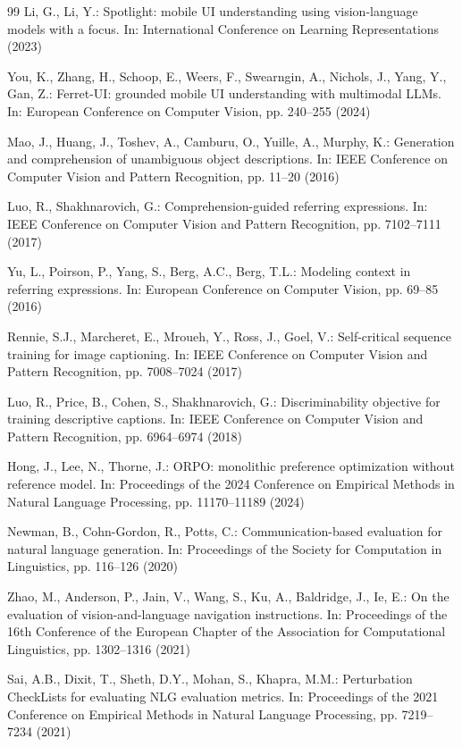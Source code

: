 \documentclass[runningheads,a4paper]{llncs}
\begin{document}
\begin{thebibliography}{99}
Li, G., Li, Y.: Spotlight: mobile UI understanding using vision-language models with a focus.
In: International Conference on Learning Representations (2023)

You, K., Zhang, H., Schoop, E., Weers, F., Swearngin, A., Nichols, J., Yang, Y., Gan, Z.:
Ferret-UI: grounded mobile UI understanding with multimodal LLMs. In: European Conference on
Computer Vision, pp. 240--255 (2024)

Mao, J., Huang, J., Toshev, A., Camburu, O., Yuille, A., Murphy, K.: Generation and comprehension
of unambiguous object descriptions. In: IEEE Conference on Computer Vision and Pattern
Recognition, pp. 11--20 (2016)

Luo, R., Shakhnarovich, G.: Comprehension-guided referring expressions. In: IEEE Conference on
Computer Vision and Pattern Recognition, pp. 7102--7111 (2017)

Yu, L., Poirson, P., Yang, S., Berg, A.C., Berg, T.L.: Modeling context in referring expressions.
In: European Conference on Computer Vision, pp. 69--85 (2016)

Rennie, S.J., Marcheret, E., Mroueh, Y., Ross, J., Goel, V.: Self-critical sequence training for
image captioning. In: IEEE Conference on Computer Vision and Pattern Recognition,
pp. 7008--7024 (2017)

Luo, R., Price, B., Cohen, S., Shakhnarovich, G.: Discriminability objective for training
descriptive captions. In: IEEE Conference on Computer Vision and Pattern Recognition,
pp. 6964--6974 (2018)

Hong, J., Lee, N., Thorne, J.: ORPO: monolithic preference optimization without reference model.
In: Proceedings of the 2024 Conference on Empirical Methods in Natural Language Processing,
pp. 11170--11189 (2024)

Newman, B., Cohn-Gordon, R., Potts, C.: Communication-based evaluation for natural language
generation. In: Proceedings of the Society for Computation in Linguistics, pp. 116--126 (2020)

Zhao, M., Anderson, P., Jain, V., Wang, S., Ku, A., Baldridge, J., Ie, E.: On the evaluation of
vision-and-language navigation instructions. In: Proceedings of the 16th Conference of the
European Chapter of the Association for Computational Linguistics, pp. 1302--1316 (2021)

Sai, A.B., Dixit, T., Sheth, D.Y., Mohan, S., Khapra, M.M.: Perturbation CheckLists for evaluating
NLG evaluation metrics. In: Proceedings of the 2021 Conference on Empirical Methods in Natural
Language Processing, pp. 7219--7234 (2021)


\end{thebibliography}
\end{document}
